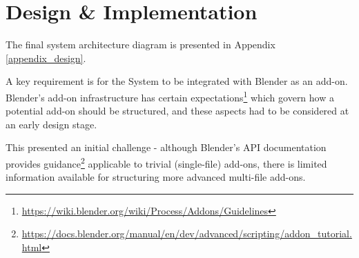 


\chapter{Design \& Implementation}\label{design_implementation}



The final system architecture diagram is presented in Appendix \ref{appendix_design}.

A key requirement is for the System to be integrated with Blender as an add-on. 
Blender's add-on infrastructure has certain expectations\footnote{\url{https://wiki.blender.org/wiki/Process/Addons/Guidelines}} which govern how a potential add-on should be structured, and these aspects had to be considered at an early design stage.

This presented an initial challenge - although Blender's API documentation provides guidance\footnote{\url{https://docs.blender.org/manual/en/dev/advanced/scripting/addon_tutorial.html}} applicable to trivial (single-file) add-ons, there is limited information available for structuring more advanced multi-file add-ons.

